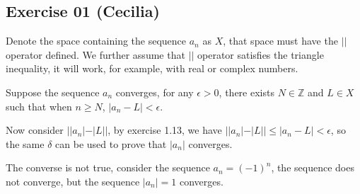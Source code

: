 \subsection*{Exercise 01 (Cecilia)}

Denote the space containing the sequence $ a_n $ as $ X $, that space must have the $ || $ operator defined. We further assume that $ || $ operator satisfies the triangle inequality, it will work, for example, with real or complex numbers.

Suppose the sequence $ a_n $ converges, for any $ \epsilon > 0 $, there exists $ N \in \mathbb{Z} $ and $ L \in X $ such that when $ n \ge N $, $ |a_n -  L| < \epsilon $. 

Now consider $ ||a_n| - |L|| $, by exercise 1.13, we have $ ||a_n| - |L|| \le |a_n - L| < \epsilon $, so the same $ \delta $ can be used to prove that $ |a_n| $ converges.

The converse is not true, consider the sequence $ a_n = (-1)^n $, the sequence does not converge, but the sequence $ |a_n| = 1 $ converges.